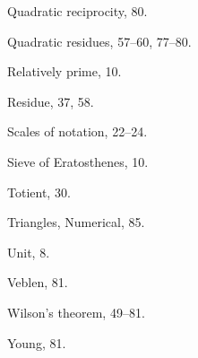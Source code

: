 \documentclass[oneside]{book}
\begin{document}
Quadratic reciprocity, 80.

Quadratic residues, 57--60, 77--80.



Relatively prime, 10.

Residue, 37, 58.



Scales of notation, 22--24.

Sieve of Eratosthenes, 10.



Totient, 30.

Triangles, Numerical, 85.



Unit, 8.



Veblen, 81.



Wilson's theorem, 49--81.



Young, 81.
\fi
\end{document}
